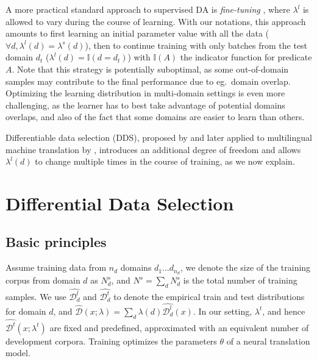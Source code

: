 \documentclass[11pt,a4paper]{article}
\newcommand{\fyTodo}[1]{\Todo[FY:]{\textcolor{orange}{#1}}}
\newcommand{\indic}[1]{\ensuremath{\mathbb{I}(#1)}}
\begin{document}
A more practical standard approach to supervised DA is \emph{fine-tuning} \cite{Luong15stanford,Freitag16fast}, where $\lambda^{l}$ is allowed to vary during the course of learning. With our notations, this approach amounts to first learning an initial parameter value with all the data ($\forall d, \lambda^{l}(d) = \lambda^{s}(d)$), then to continue training with only batches from the test domain $d_t$ ($\lambda^{l}(d) = \indic{d = d_t}$) with $\indic{A}$ the indicator function for predicate $A$. Note that this strategy is potentially suboptimal, as some out-of-domain samples may contribute to the final performance due to eg.\ domain overlap. Optimizing the learning distribution in multi-domain settings is even more challenging, as the learner has to best take advantage of potential domains overlaps, and also of the fact that some domains are easier to learn than others.\fyTodo{How to measure this?} 

Differentiable data selection (DDS), proposed by \citet{Wang20optimizing} and later applied to multilingual machine translation by \citet{Wang20balancing}, introduces an additional degree of freedom and allows $\lambda^{l}(d)$ to change multiple times in the course of training, as we now explain.


\section{Differential Data Selection} \label{sec:dds}
\subsection{Basic principles}
Assume training data from $n_d$ domains $d_1 \dots d_{n_d}$, we denote the size of the training corpus from domain $d$ as  $N^{s}_d$, and $N^{s} = \sum_d N^{s}_d$ is the total number of training samples. We use $\widehat{\mathcal{D}^l_d}$ and $\widehat{\mathcal{D}^t _d}$ to denote the empirical train and test distributions for domain $d$, and $\widehat{\mathcal{D}}(x;\lambda) = \sum_{d} \lambda(d) \widehat{\mathcal{D}^l_d}(x)$. In our setting,  $\lambda^t$, and hence $\widehat{\mathcal{D}^t}(x;\lambda^t)$ are fixed and predefined, approximated with an equivalent number of development corpora. Training optimizes the parameters $\theta$ of a neural translation model.
\end{document}
